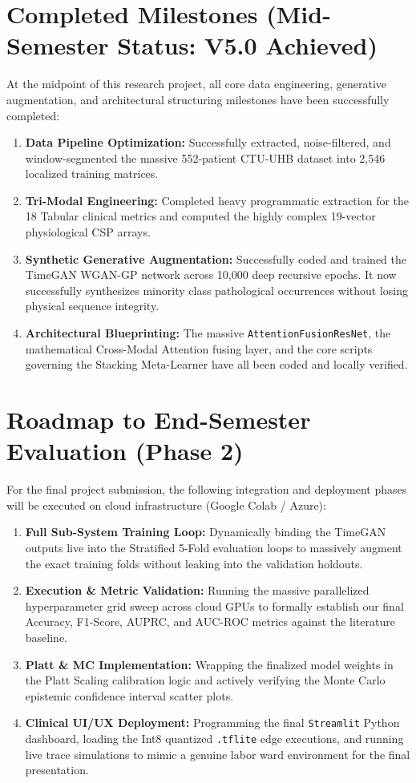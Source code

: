 \documentclass[12pt,a4paper]{report}
\begin{document}
\section{Completed Milestones (Mid-Semester Status: V5.0 Achieved)}
At the midpoint of this research project, all core data engineering, generative augmentation, and architectural structuring milestones have been successfully completed:
\begin{enumerate}
    \item \textbf{Data Pipeline Optimization:} Successfully extracted, noise-filtered, and window-segmented the massive 552-patient CTU-UHB dataset into 2,546 localized training matrices.
    \item \textbf{Tri-Modal Engineering:} Completed heavy programmatic extraction for the 18 Tabular clinical metrics and computed the highly complex 19-vector physiological CSP arrays.
    \item \textbf{Synthetic Generative Augmentation:} Successfully coded and trained the TimeGAN WGAN-GP network across 10,000 deep recursive epochs. It now successfully synthesizes minority class pathological occurrences without losing physical sequence integrity.
    \item \textbf{Architectural Blueprinting:} The massive \texttt{AttentionFusionResNet}, the mathematical Cross-Modal Attention fusing layer, and the core scripts governing the Stacking Meta-Learner have all been coded and locally verified.
\end{enumerate}

\section{Roadmap to End-Semester Evaluation (Phase 2)}
For the final project submission, the following integration and deployment phases will be executed on cloud infrastructure (Google Colab / Azure):
\begin{enumerate}
    \item \textbf{Full Sub-System Training Loop:} Dynamically binding the TimeGAN outputs live into the Stratified 5-Fold evaluation loops to massively augment the exact training folds without leaking into the validation holdouts.
    \item \textbf{Execution \& Metric Validation:} Running the massive parallelized hyperparameter grid sweep across cloud GPUs to formally establish our final Accuracy, F1-Score, AUPRC, and AUC-ROC metrics against the literature baseline.
    \item \textbf{Platt \& MC Implementation:} Wrapping the finalized model weights in the Platt Scaling calibration logic and actively verifying the Monte Carlo epistemic confidence interval scatter plots.
    \item \textbf{Clinical UI/UX Deployment:} Programming the final \texttt{Streamlit} Python dashboard, loading the Int8 quantized \texttt{.tflite} edge executions, and running live trace simulations to mimic a genuine labor ward environment for the final presentation.
\end{enumerate}
\end{document}
